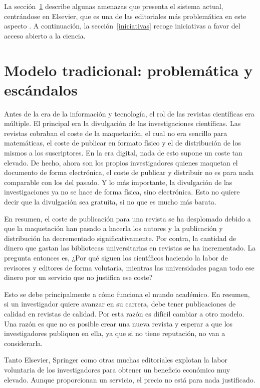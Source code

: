  


La sección~\ref{amenazas} describe algunas amenazas que presenta el sistema actual, centrándose en Elsevier, que es una de las editoriales más problemática en este aspecto \cite{costknowledge}. A continuación, la sección~\ref{iniciativas} recoge iniciativas a favor del acceso abierto a la ciencia.

\section{Modelo tradicional: problemática y escándalos}\label{amenazas}

Antes de la era de la información y tecnología, el rol de las revistas científicas era múltiple. El principal era la divulgación de las investigaciones científicas. Las revistas cobraban el coste de la maquetación, el cual no era sencillo para matemáticas, el coste de publicar en formato físico y el de distribución de los mismos a los suscriptores. En la era digital, nada de esto supone un coste tan elevado. De hecho, ahora son los propios investigadores quienes maquetan el documento de forma electrónica, el coste de publicar y distribuir no es para nada comparable con los del pasado. Y lo más importante, la divulgación de las investigaciones ya no se hace de forma física, sino electrónica. Esto no quiere decir que la divulgación sea gratuita, si no que es mucho más barata.

En resumen, el coste de publicación para una revista se ha desplomado debido a que la maquetación han pasado a hacerla los autores y la publicación y distribución ha decrementado significativamente. Por contra, la cantidad de dinero que gastan las bibliotecas universitarias en revistas se ha incrementado. La pregunta entonces es, ¿Por qué siguen los científicos haciendo la labor de revisores y editores de forma volutaria, mientras las universidades pagan todo ese dinero por un servicio que no justifica ese coste?

Esto se debe principalmente a cómo funciona el mundo académico. En resumen, si un investigador quiere avanzar en su carrera, debe tener publicaciones de calidad en revistas de calidad. Por esta razón es difícil cambiar a otro modelo. Una razón es que no es posible crear una nueva revista y esperar a que los investigadores publiquen en ella, ya que si no tiene reputación, no van a considerarla.

Tanto Elsevier, Springer como otras muchas editoriales explotan la labor voluntaria de los investigadores para obtener un beneficio económico muy elevado. Aunque proporcionan un servicio, el precio no está para nada justificado.

